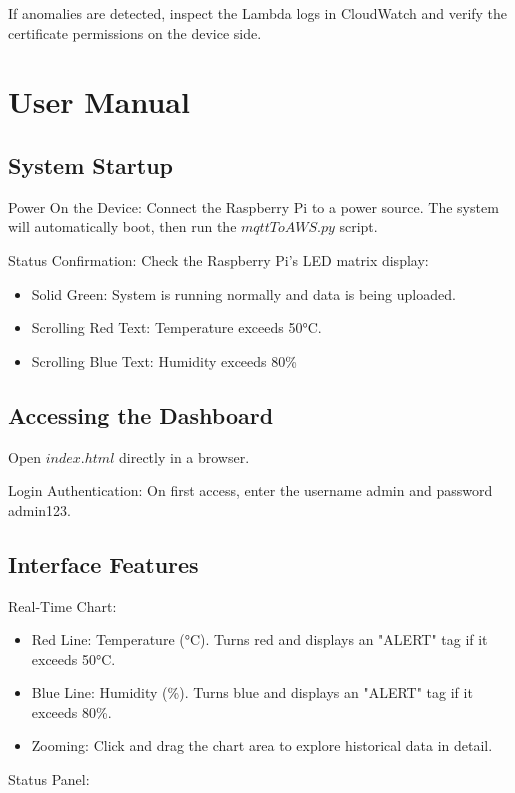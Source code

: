 \documentclass[12pt,a4paper]{article}
\begin{document}
\vspace{\baselineskip}
\noindent
If anomalies are detected, inspect the Lambda logs in CloudWatch and verify the certificate permissions on the device side.

\section{User Manual}

\subsection{System Startup}
Power On the Device: Connect the Raspberry Pi to a power source. The system will automatically boot, then run the $mqttToAWS.py$ script.

\noindent
Status Confirmation: Check the Raspberry Pi’s LED matrix display:

\begin{itemize}
  \item Solid Green: System is running normally and data is being uploaded.
  \item Scrolling Red Text: Temperature exceeds 50°C.
  \item Scrolling Blue Text: Humidity exceeds 80\%
\end{itemize}

\subsection{Accessing the Dashboard}
Open $index.html$ directly in a browser.

\noindent
Login Authentication: On first access, enter the username admin and password admin123.

\subsection{Interface Features}
Real-Time Chart:
\begin{itemize}
  \item Red Line: Temperature (°C). Turns red and displays an "ALERT" tag if it exceeds 50°C.
  \item Blue Line: Humidity (\%). Turns blue and displays an "ALERT" tag if it exceeds 80\%.
  \item Zooming: Click and drag the chart area to explore historical data in detail.
\end{itemize}

\noindent
Status Panel:
\end{document}

